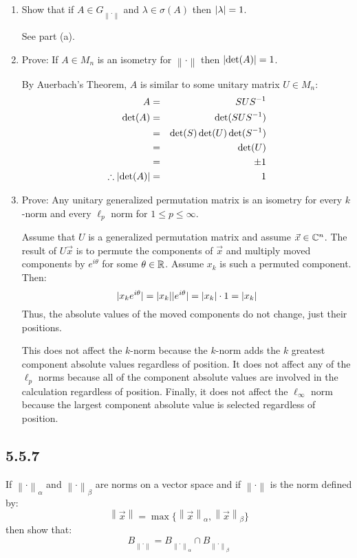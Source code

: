 \documentclass[letterpaper,12pt,fleqn]{article}
\newcommand{\norm}[1]{\left\lVert#1\right\rVert}
\newcommand{\vx}{\vec{x}}
\renewcommand{\a}{\alpha}
\renewcommand{\b}{\beta}
\renewcommand{\l}{\lambda}
\renewcommand{\o}{\sigma}
\newcommand{\nc}{\norm{\cdot}}
\newcommand{\ig}{G_{\nc}}
\begin{document}
\begin{enumerate}[label={\alph*)}]
\item Show that if $A\in\ig$ and $\l\in\o(A)$ then $\abs{\l}=1$.

  See part (a).

\item Prove: If $A\in M_n$ is an isometry for $\nc$ then $\lvert\det(A)\rvert=1$.

  By Auerbach's Theorem, $A$ is similar to some unitary matrix $U\in M_n$:
  \begin{eqnarray*}
    A &=& SUS^{-1} \\
    \det(A) &=& \det(SUS^{-1}) \\
    &=& \det(S)\det(U)\det(S^{-1}) \\
    &=& \det(U) \\
    &=& \pm1 \\
    \therefore\lvert\det(A)\rvert &=& 1
  \end{eqnarray*}

\item Prove: Any unitary generalized permutation matrix is an isometry for
  every $k$-norm and every $\ell_p$ norm for $1\le p\le\infty$.

  Assume that $U$ is a generalized permutation matrix and assume $\vx\in\C^n$.
  The result of $U\vx$ is to permute the components of $\vx$ and multiply moved
  components by $e^{i\theta}$ for some $\theta\in\mathbb{R}$. Assume $x_k$ is such a
  permuted component. Then:
  \[\lvert x_ke^{i\theta}\rvert=\lvert x_k\rvert\lvert e^{i\theta}\rvert=\lvert x_k\rvert\cdot1=\lvert x_k\rvert\]
  Thus, the absolute values of the moved components do not change, just their
  positions.

  This does not affect the $k$-norm because the $k$-norm adds the $k$ greatest
  component absolute values regardless of position. It does not affect any of
  the $\ell_p$ norms because all of the component absolute values are involved
  in the calculation regardless of position. Finally, it does not affect the
  $\ell_{\infty}$ norm because the largest component absolute value is selected
  regardless of position.
\end{enumerate}

\subsection*{5.5.7}

If $\nc_{\a}$ and $\nc_{\b}$ are norms on a vector space and if $\nc$ is the
norm defined by:
\[\norm{\vx}=\max\{\norm{\vx}_{\a},\norm{\vx}_{\b}\}\]
then show that:
\[B_{\nc}=B_{\nc_{\a}}\cap B_{\nc_{\b}}\]
\end{document}
